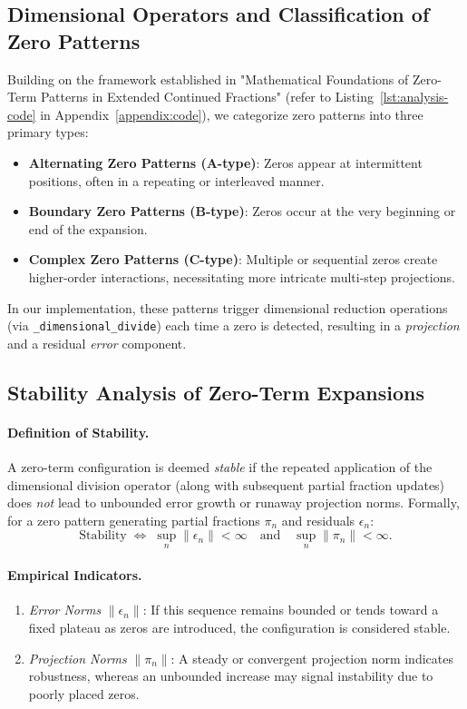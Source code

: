 \subsection{Dimensional Operators and Classification of Zero Patterns}
Building on the framework established in "Mathematical Foundations of Zero-Term Patterns in Extended Continued Fractions" (refer to Listing~\ref{lst:analysis-code} in Appendix~\ref{appendix:code}), we categorize zero patterns into three primary types:
\begin{itemize}
  \item \textbf{Alternating Zero Patterns (A-type)}: Zeros appear at intermittent positions, often in a repeating or interleaved manner.
  \item \textbf{Boundary Zero Patterns (B-type)}: Zeros occur at the very beginning or end of the expansion.
  \item \textbf{Complex Zero Patterns (C-type)}: Multiple or sequential zeros create higher-order interactions, necessitating more intricate multi-step projections.
\end{itemize}
In our implementation, these patterns trigger dimensional reduction operations (via \texttt{\_dimensional\_divide}) each time a zero is detected, resulting in a \emph{projection} and a residual \emph{error} component.

\subsection{Stability Analysis of Zero-Term Expansions}
\label{sec:stability}

\paragraph{Definition of Stability.}
A zero-term configuration is deemed \emph{stable} if the repeated application of the dimensional division operator (along with subsequent partial fraction updates) does \emph{not} lead to unbounded error growth or runaway projection norms. Formally, for a zero pattern generating partial fractions \(\pi_n\) and residuals \(\epsilon_n\):
\[
\text{Stability} \;\iff\; \sup_{n} \|\epsilon_n\| < \infty 
\quad\text{and}\quad 
\sup_{n} \|\pi_n\| < \infty.
\]

\paragraph{Empirical Indicators.}
\begin{enumerate}
  \item \emph{Error Norms} \(\|\epsilon_n\|\): If this sequence remains bounded or tends toward a fixed plateau as zeros are introduced, the configuration is considered stable.
  \item \emph{Projection Norms} \(\|\pi_n\|\): A steady or convergent projection norm indicates robustness, whereas an unbounded increase may signal instability due to poorly placed zeros.
\end{enumerate}

